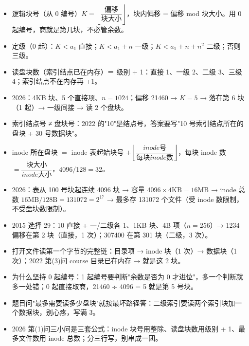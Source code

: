 \documentclass[10pt,a4paper]{ctexart}
\begin{document}
\begin{itemize}

\item 逻辑块号（从 0 编号）$K=\left\lfloor \dfrac{\text{偏移}}{\text{块大小}} \right\rfloor$，块内偏移 = 偏移 mod 块大小。用 0 起编号，商就是第几块，不必管余数。

\item 定级（0 起）：$K<a_1$ 直接；$K<a_1+n$ 一级；$K<a_1+n+n^2$ 二级；否则三级。

\item 读盘块数（索引结点已在内存）＝ 级别 + 1：直接 1、一级 2、二级 3、三级 4；索引结点不在内存再 +1。

\item 2026：4KB 块、5 个直接项、$n=1024$；偏移 21460 → $K=5$ → 落在第 6 块（1 起）→ 一级间接 → 读 2 个盘块。

\item 索引结点号 ≠ 盘块号：2022 的"10"是结点号，答案要写"10 号索引结点所在的盘块 + 30 号数据块"。

\item inode 所在盘块 $=$ inode 表起始块号 $+\left\lfloor \dfrac{inode 号}{每块 inode 数} \right\rfloor$，每块 inode 数 $=\dfrac{块大小}{inode 大小}$，$4096/128=32$。

\item 2026：表从 100 号块起连续 4096 块 → 容量 $4096\times4\text{KB}=16\text{MB}$ → inode 总数 $16\text{MB}/128\text{B}=131072=2^{17}$ → 最多存 131072 个文件（受 inode 数限制，不受盘块数限制）。

\item 2015 选择 29：10 直接 + 一/二级各 1、1KB 块、4B 项（$n=256$）→ 1234 偏移在第 2 块（直接，1 次）；307400 在第 301 块（二级，3 次）。

\item 打开文件读第一个字节的完整链：目录项 → inode 块（1 次）→ 数据块（1 次）；2022 第(3)问 course 目录已在内存 → 就是这 2 块。

\item 为什么坚持 0 起编号：1 起编号要判断"余数是否为 0 才进位"，多一个判断就多一处错；0 起直接取商，21460 ÷ 4096 = 5 就是第 5 号块。

\item 题目问"最多需要读多少盘块"就按最坏路径答：二级索引要读两个索引块加一个数据块，别心疼，写满 3。

\item 2026 第(1)问三小问是三套公式：inode 块号用整除、读盘块数用级别 + 1、最多文件数用 inode 总数；分三行写，别串成一团。

\end{itemize}
\end{document}
